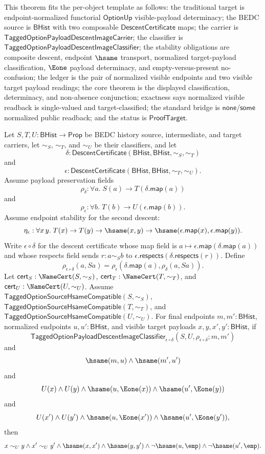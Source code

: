 \begin{theorem}
\label{thm:tagged-option-composite-image-classifier-normalized-visible-payload-determinacy}
This theorem fits the per-object template as follows: the traditional target is
endpoint-normalized functorial $\mathsf{OptionUp}$ visible-payload determinacy;
the BEDC source is $\mathsf{BHist}$ with two composable
$\mathsf{DescentCertificate}$ maps; the carrier is
$\mathsf{TaggedOptionPayloadDescentImageCarrier}$; the classifier is
$\mathsf{TaggedOptionPayloadDescentImageClassifier}$; the stability obligations
are composite descent, endpoint $\hsame$ transport, normalized target-payload
classification, $\Eone$ payload determinacy, and empty-versus-present
no-confusion; the ledger is the pair of normalized visible endpoints and two
visible target payload readings; the core theorem is the displayed
classification, determinacy, and non-absence conjunction; exactness says
normalized visible readback is single-valued and target-classified; the standard
bridge is $\mathsf{none}$/$\mathsf{some}$ normalized public readback; and the
status is $\mathsf{ProofTarget}$.

Let $S,T,U:\mathsf{BHist}\to\mathsf{Prop}$ be BEDC history source,
intermediate, and target carriers, let $\sim_S$, $\sim_T$, and $\sim_U$ be their
classifiers, and let
$$
\delta:\mathsf{DescentCertificate}(\mathsf{BHist},\mathsf{BHist},\sim_S,\sim_T)
$$
and
$$
\epsilon:\mathsf{DescentCertificate}(\mathsf{BHist},\mathsf{BHist},\sim_T,\sim_U).
$$
Assume payload preservation fields
$$
\rho_{\delta}:\forall a.\;S(a)\to T(\delta.\mathsf{map}(a))
$$
and
$$
\rho_{\epsilon}:\forall b.\;T(b)\to U(\epsilon.\mathsf{map}(b)).
$$
Assume endpoint stability for the second descent:
$$
\eta_{\epsilon}:\forall x\,y.\;
T(x)\to T(y)\to \hsame(x,y)\to
\hsame(\epsilon.\mathsf{map}(x),\epsilon.\mathsf{map}(y)).
$$
Write $\epsilon\circ\delta$ for the descent certificate whose map field is
$a\mapsto\epsilon.\mathsf{map}(\delta.\mathsf{map}(a))$ and whose respects field
sends $r:a\sim_S b$ to
$\epsilon.\mathsf{respects}(\delta.\mathsf{respects}(r))$. Define
$$
\rho_{\epsilon\circ\delta}(a,Sa)=
\rho_{\epsilon}(\delta.\mathsf{map}(a),\rho_{\delta}(a,Sa)).
$$
Let $\mathsf{cert}_S:\NameCert(S,\sim_S)$,
$\mathsf{cert}_T:\NameCert(T,\sim_T)$, and
$\mathsf{cert}_U:\NameCert(U,\sim_U)$. Assume
$\mathsf{TaggedOptionSourceHsameCompatible}(S,\sim_S)$,
$\mathsf{TaggedOptionSourceHsameCompatible}(T,\sim_T)$, and
$\mathsf{TaggedOptionSourceHsameCompatible}(U,\sim_U)$. For final endpoints
$m,m':\mathsf{BHist}$, normalized endpoints $u,u':\mathsf{BHist}$, and visible
target payloads $x,y,x',y':\mathsf{BHist}$, if
$$
\mathsf{TaggedOptionPayloadDescentImageClassifier}_{\epsilon\circ\delta}
(S,U,\rho_{\epsilon\circ\delta};m,m')
$$
and
$$
\hsame(m,u)\land \hsame(m',u')
$$
and
$$
U(x)\land U(y)\land
\hsame(u,\Eone(x))\land \hsame(u',\Eone(y))
$$
and
$$
U(x')\land U(y')\land
\hsame(u,\Eone(x'))\land \hsame(u',\Eone(y')),
$$
then
$$
x\sim_U y\land
x'\sim_U y'\land
\hsame(x,x')\land
\hsame(y,y')\land
\neg\hsame(u,\emp)\land
\neg\hsame(u',\emp).
$$
\end{theorem}
